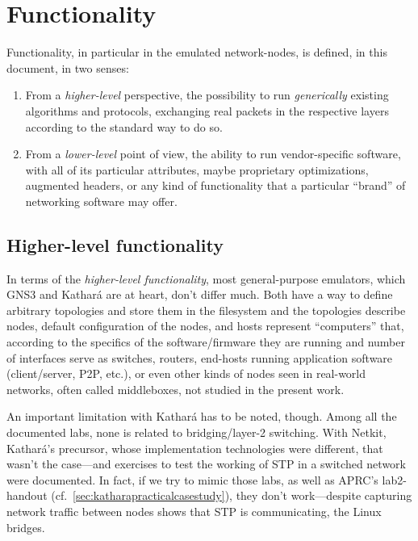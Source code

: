\section{Functionality}
\label{sec:comparativefunctionality}

Functionality, in particular in the emulated network-nodes, is defined, in this document, in two senses:
\begin{enumerate}
  \item From a \emph{higher-level} perspective, the possibility to run \emph{generically} existing algorithms and protocols, exchanging real packets in the respective layers according to the standard way to do so.
  \item From a \emph{lower-level} point of view, the ability to run vendor-specific software, with all of its particular attributes, maybe proprietary optimizations, augmented headers, or any kind of functionality that a particular ``brand'' of networking software may offer.
\end{enumerate}

\subsection{Higher-level functionality}

In terms of the \emph{higher-level functionality}, most general-purpose emulators, which GNS3 and Kathará are at heart, don't differ much.
Both have a way to define arbitrary topologies and store them in the filesystem and the topologies describe nodes, default configuration of the nodes, and hosts represent ``computers'' that, according to the specifics of the software/firmware they are running and number of interfaces serve as switches, routers, end-hosts running application software (client/server, P2P, etc.), or even other kinds of nodes seen in real-world networks, often called middleboxes, not studied in the present work.

An important limitation with Kathará has to be noted, though.
Among all the documented labs, none is related to bridging/layer-2 switching.
With Netkit, Kathará's precursor, whose implementation technologies were different, that wasn't the case---and exercises to test the working of STP in a switched network were documented.
In fact, if we try to mimic those labs, as well as APRC's lab2-handout (cf.~\ref{sec:katharapracticalcasestudy}), they don't work---despite capturing network traffic between nodes shows that STP is communicating, the Linux bridges.

